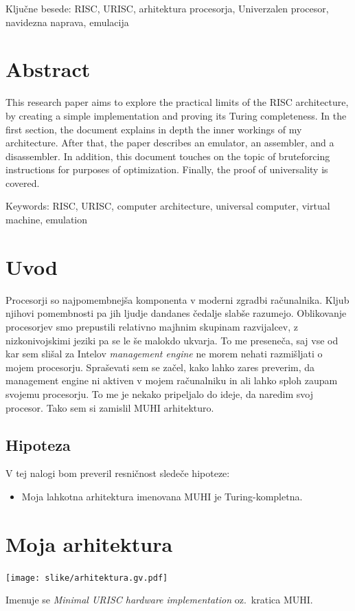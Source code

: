 \documentclass[12pt]{article}
\begin{document}
Ključne besede: RISC, URISC, arhitektura procesorja, Univerzalen procesor, navidezna naprava, emulacija

\section{Abstract}
This research paper aims to explore the practical limits of the RISC architecture, by creating a simple implementation and proving its Turing completeness.
In the first section, the document explains in depth the inner workings of my architecture.
After that, the paper describes an emulator, an assembler, and a disassembler.
In addition, this document touches on the topic of bruteforcing instructions for purposes of optimization.
Finally, the proof of universality is covered.

Keywords: RISC, URISC, computer architecture, universal computer, virtual machine, emulation

\pagebreak
{}
\setcounter{page}{6}

\section{Uvod}
Procesorji so najpomembnejša komponenta v moderni zgradbi računalnika.
Kljub njihovi pomembnosti pa jih ljudje dandanes čedalje slabše razumejo.
Oblikovanje procesorjev smo prepustili relativno majhnim skupinam razvijalcev, z nizkonivojskimi jeziki pa se le še malokdo ukvarja.
To me preseneča, saj vse od kar sem slišal za Intelov \textit{management engine} ne morem nehati razmišljati o mojem procesorju.
Spraševati sem se začel, kako lahko zares preverim, da management engine ni aktiven v mojem računalniku in ali lahko sploh zaupam svojemu procesorju.
To me je nekako pripeljalo do ideje, da naredim svoj procesor.
Tako sem si zamislil MUHI arhitekturo.

\subsection{Hipoteza}
V tej nalogi bom preveril resničnost sledeče hipoteze:
\begin{itemize}
  \item Moja lahkotna arhitektura imenovana MUHI je Turing-kompletna.
\end{itemize}

\section{Moja arhitektura}
\begin{center}
  \texttt{[image: slike/arhitektura.gv.pdf]}
\end{center}
Imenuje se \textit{Minimal URISC hardware implementation} oz.\ kratica MUHI.\@
\end{document}
